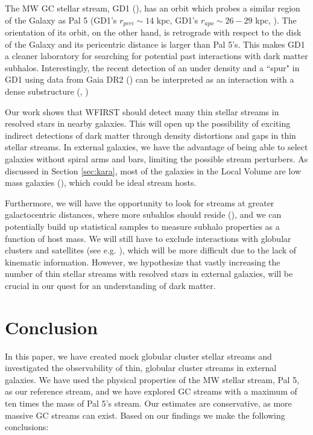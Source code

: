 \documentclass[twocolumn]{aastex62}
\begin{document}
The MW GC stellar stream, GD1 (\citealt{grillmair06}), has an orbit which probes a similar region of the Galaxy as Pal 5 (GD1's $r_{peri} \sim 14$ kpc, GD1's $r_{apo} \sim 26-29$ kpc, \citealt{koposov10}). The orientation of its orbit, on the other hand, is retrograde with respect to the disk of the Galaxy and its pericentric distance is larger than Pal 5's. This makes GD1 a cleaner laboratory for searching for potential past interactions with dark matter subhalos. Interestingly, the recent detection of an under density and a ``spur" in GD1 using data from Gaia DR2 (\citealt{gaiadr2}) can be interpreted as an interaction with a dense substructure (\citealt{price18}, \citealt{bonaca19})

Our work shows that WFIRST should detect many thin stellar streams in resolved stars in nearby galaxies. This will open up the possibility of exciting indirect detections of dark matter through density distortions and gaps in thin stellar streams. In external galaxies, we have the advantage of being able to select galaxies without spiral arms and bars, limiting the possible stream perturbers. As discussed in Section \ref{sec:kara}, most of the galaxies in the Local Volume are low mass galaxies (\citealt{kara19}), which could be ideal stream hosts. 

Furthermore, we will  have the opportunity to look for streams at greater galactocentric distances, where more subahlos should reside (\citealt{garrison17}), and we can potentially build up statistical samples to measure subhalo properties as a function of host mass. 
We will still have to exclude interactions with globular clusters and satellites (see e.g. \citealt{bonaca19}), which will be more difficult due to the lack of kinematic information. However, we hypothesize that vastly increasing the number of thin stellar streams with resolved stars in external galaxies, will be crucial in our quest for an understanding of dark matter. 

\section{Conclusion}\label{sec:conclusion}
In this paper, we have created mock globular cluster stellar streams and investigated the observability of thin, globular cluster streams in external galaxies. We have used the physical properties of the MW stellar stream, Pal 5, as our reference stream, and we have explored GC streams with a maximum of ten times the mass of Pal 5's stream. Our estimates are conservative, as more massive GC streams can exist. Based on our findings we make the following conclusions:
\end{document}
